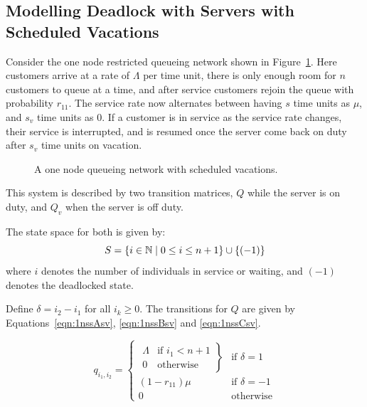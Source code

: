 \documentclass{article}
\begin{document}
\subsection{Modelling Deadlock with Servers with Scheduled Vacations}\label{sec:modelscheduledvacations}

Consider the one node restricted queueing network shown in Figure~\ref{fig:1nodescheduledvacations}.
Here customers arrive at a rate of $\Lambda$ per time unit, there is only enough room for $n$ customers to queue at a time, and after service customers rejoin the queue with probability $r_{11}$.
The service rate now alternates between having $s$ time units as $\mu$, and $s_v$ time units as $0$.
If a customer is in service as the service rate changes, their service is interrupted, and is resumed once the server come back on duty after $s_v$ time units on vacation.

\begin{figure}[!hbtp]
    \begin{center}
        
    \end{center}
    \caption{A one node queueing network with scheduled vacations.}
    \label{fig:1nodescheduledvacations}
\end{figure}

This system is described by two transition matrices, $Q$ while the server is on duty, and $Q_v$ when the server is off duty.

The state space for both is given by:
        \[S = \{i\in\mathbb{N} \nonscript\; | \nonscript\; 0 \leq i \leq n + 1
        \}\cup\{(-1)\}\]
where \(i\) denotes the number of individuals in service or waiting, and $(-1)$ denotes the deadlocked state.

Define $\delta = i_2 - i_1$ for all $i_k \geq 0$.
The transitions for $Q$ are given by Equations~\ref{eqn:1nssAsv}, \ref{eqn:1nssBsv} and \ref{eqn:1nssCsv}.

\begin{equation}\label{eqn:1nssAsv}
  q_{i_1, i_2} = \left\{
  \begin{array}{rr}
    \left. \begin{array}{rr}
      \Lambda & \text{if } i_1 < n + 1 \\
      0 & \text{otherwise}
    \end{array} \right\} & \text{if } \delta = 1 \\
    (1 - r_{11})\mu & \text{if } \delta = -1 \\
    0 & \text{otherwise}
  \end{array} \right.
\end{equation}
\end{document}
